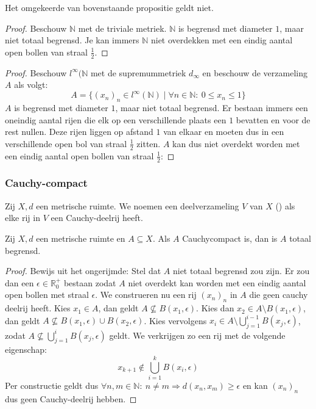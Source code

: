 \documentclass[main.tex]{subfiles}
\begin{document}
\begin{tvb}
  Het omgekeerde van bovenstaande propositie geldt niet.

  \begin{proof}
    Beschouw $\mathbb{N}$ met de triviale metriek.
    $\mathbb{N}$ is begrensd met diameter $1$, maar niet totaal begrensd.
    Je kan immers $\mathbb{N}$ niet overdekken met een eindig aantal open bollen van straal $\frac{1}{2}$.
  \end{proof}
  \begin{proof}
    Beschouw $l^{\infty}(\mathbb{N}$ met de supremummetriek $d_{\infty}$ en beschouw de verzameling $A$ als volgt:
    \[ A = \{ (x_{n})_{n} \in l^{\infty}(\mathbb{N}) \mid \forall n\in \mathbb{N}:\ 0 \le x_{n} \le 1 \} \]
    $A$ is begrensd met diameter $1$, maar niet totaal begrensd.
    Er bestaan immers een oneindig aantal rijen die elk op een verschillende plaats een $1$ bevatten en voor de rest nullen.
    Deze rijen liggen op afstand $1$ van elkaar en moeten dus in een verschillende open bol van straal $\frac{1}{2}$ zitten.
    $A$ kan dus niet overdekt worden met een eindig aantal open bollen van straal $\frac{1}{2}$:
  \end{proof}
\end{tvb}

\subsubsection{Cauchy-compact}
\label{sec:cauchy-compact}

\begin{de}
  Zij $X,d$ een metrische ruimte.
  We noemen een deelverzameling $V$ van $X$  () als elke rij in $V$ een Cauchy-deelrij heeft.
\end{de}

\begin{st}
  \label{st:cauchycompact-dan-totaal-begrensd}
  Zij $X,d$ een metrische ruimte en $A \subseteq X$.
  Als $A$ Cauchycompact is, dan is $A$ totaal begrensd.

  \begin{proof}
    Bewijs uit het ongerijmde: Stel dat $A$ niet totaal begrensd zou zijn.
    Er zou dan een $\epsilon \in \mathbb{R}_{0}^{+}$ bestaan zodat $A$ niet overdekt kan worden met een eindig aantal open bollen met straal $\epsilon$.
    We construeren nu een rij $(x_{n})_{n}$ in $A$ die geen cauchy deelrij heeft.
    Kies $x_{1}\in A$, dan geldt $A \not\subseteq B(x_{1},\epsilon)$.
    Kies dan $x_{2}\in A \setminus B(x_{1},\epsilon)$, dan geldt $A \not \subseteq B(x_{1},\epsilon) \cup B(x_{2},\epsilon)$.
    Kies vervolgens $x_{i}\in A\setminus \bigcup_{j=1}^{i-1}B(x_{j},\epsilon)$, zodat $A \not \subseteq \bigcup_{j=1}^{i}B(x_{j},\epsilon)$ geldt.
    We verkrijgen zo een rij met de volgende eigenschap:
    \[ x_{k+1} \not \in \bigcup_{i=1}^{k}B(x_{i},\epsilon) \]
    Per constructie geldt dus $\forall n,m\in \mathbb{N}:\ n\neq m \Rightarrow d(x_{n},x_{m}) \ge \epsilon$ en kan $(x_{n})_{n}$ dus geen Cauchy-deelrij hebben.
  \end{proof}
\end{st}
\end{document}
